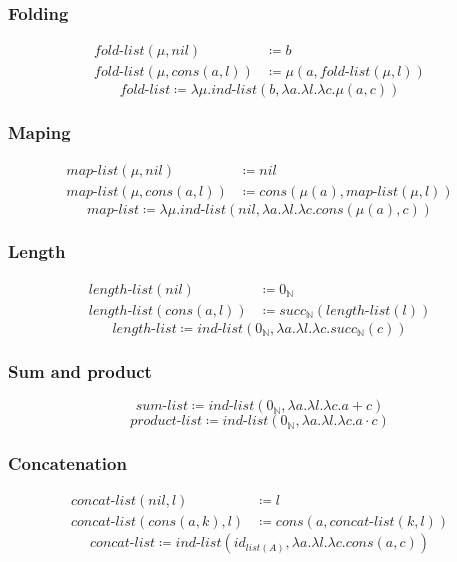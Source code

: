 \documentclass{article}
\begin{document}
\subsubsection{Folding}
\begin{align}
    fold\text{-}list(\mu,nil) &\coloneqq b \\
    fold\text{-}list(\mu,cons(a,l)) &\coloneqq \mu(a,fold\text{-}list(\mu,l))
\end{align}
$$
    fold\text{-}list \coloneqq \lambda\mu.ind\text{-}list(b,\lambda a.\lambda l.\lambda c.\mu(a,c))
$$
\subsubsection{Maping}
\begin{align}
    map\text{-}list(\mu,nil) &\coloneqq nil\\
    map\text{-}list(\mu,cons(a,l)) &\coloneqq cons(\mu(a), map\text{-}list(\mu,l))
\end{align}
$$
    map\text{-}list \coloneqq \lambda \mu.ind\text{-}list(nil,\lambda a.\lambda l. \lambda c.cons(\mu(a),c))
$$
\subsubsection{Length}
\begin{align}
    length\text{-}list(nil) &\coloneqq 0_\mathbb{N}\\
    length\text{-}list(cons(a,l)) &\coloneqq succ_\mathbb{N}(length\text{-}list(l))
\end{align}
$$
    length\text{-}list \coloneqq ind\text{-}list(0_\mathbb{N},\lambda a.\lambda l. \lambda c.succ_\mathbb{N}(c))
$$
\subsubsection{Sum and product}
$$
    sum\text{-}list \coloneqq ind\text{-}list(0_\mathbb{N},\lambda a.\lambda l. \lambda c.a + c)
$$
$$
    product\text{-}list \coloneqq ind\text{-}list(0_\mathbb{N},\lambda a.\lambda l. \lambda c.a \cdot c)
$$
\subsubsection{Concatenation}
\begin{align}
    concat\text{-}list(nil,l) &\coloneqq l\\
    concat\text{-}list(cons(a,k),l) &\coloneqq cons(a,concat\text{-}list(k,l))
\end{align}
$$
    concat\text{-}list \coloneqq ind\text{-}list(id_{list(A)},\lambda a.\lambda l.\lambda c.cons(a, c))
$$
\end{document}
